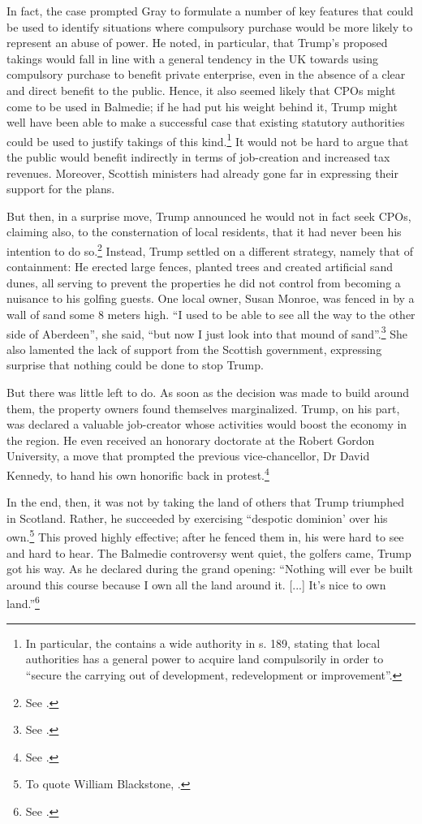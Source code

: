 In fact, the case prompted Gray to formulate a number of key features that could be used to identify situations where compulsory purchase would be more likely to represent an abuse of power. He noted, in particular, that Trump's proposed takings would fall in line with a general tendency in the UK towards using compulsory purchase to benefit private enterprise, even in the absence of a clear and direct benefit to the public. Hence, it also seemed likely that CPOs might come to be used in Balmedie; if he had put his weight behind it, Trump might well have been able to make a successful case that existing statutory authorities could be used to justify takings of this kind.\footnote{In particular, the \cite{tcpsa97} contains a wide authority in s. 189, stating that local authorities has a general power to acquire land compulsorily in order to ``secure the carrying out of development, redevelopment or improvement''.} It would not be hard to argue that the public would benefit indirectly in terms of job-creation and increased tax revenues. Moreover, Scottish ministers had already gone far in expressing their support for the plans.

But then, in a surprise move, Trump announced he would not in fact seek CPOs, claiming also, to the consternation of local residents, that it had never been his intention to do so.\footnote{See \cite{scotsman11}.} Instead, Trump settled on a different strategy, namely that of containment: He erected large fences, planted trees and created artificial sand dunes, all serving to prevent the properties he did not control from becoming a nuisance to his golfing guests. One local owner, Susan Monroe, was fenced in by a wall of sand some 8 meters high. ``I used to be able to see all the way to the other side of Aberdeen'', she said, ``but now I just look into that mound of sand''.\footnote{See \cite{booth12}.} She also lamented the lack of support from the Scottish government, expressing surprise that nothing could be done to stop Trump.

But there was little left to do. As soon as the decision was made to build around them, the  property owners found themselves marginalized. Trump, on his part, was declared a valuable job-creator whose activities would boost the economy in the region. He even received an honorary doctorate at the Robert Gordon University, a move that prompted the previous vice-chancellor, Dr David Kennedy, to hand his own honorific back in protest.\footnote{See \cite{bbc10b}.}

In the end, then, it was not by taking the land of others that Trump triumphed in Scotland. Rather, he succeeded by exercising ``despotic dominion' over his own.\footnote{To quote William Blackstone, \cite[2]{blackstone79b}.} This proved highly effective;  after he fenced them in, his  were hard to see and hard to hear. The Balmedie controversy went quiet, the golfers came, Trump got his way. As he declared during the grand opening: ``Nothing will ever be built around this course because I own all the land around it. [...] It's nice to own land.''\footnote{See \cite{booth12}.}

